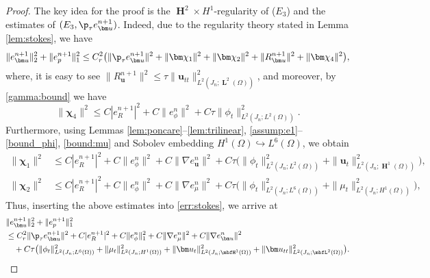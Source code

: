 \begin{proof}
	The key idea for the proof is the $ \mbfH^2\times H^1$-regularity of ($E_3$) and the estimates of $(E_3, \p_\tau e_{\bm u}^{n+1})$. 
	Indeed, due to the  regularity theory stated in Lemma \ref{lem:stokes}, we have
	\begin{equation} \label{err:stokes}
		\|e_{\bm u}^{n+1}\|_2^2+\|e_p^{n+1}\|_1^2\leq  C_r^2 \big(\|\p_\tau e_{\bm u}^{n+1}\|^2+\|\bm \chi_1\|^2 +\|\bm \chi_2\|^2 +\|R_{\bm u}^{n+1}\|^2+ \|\bm \chi_4\|^2 \big),
	\end{equation}
	where, it is easy to see $\|R_{\bm u}^{n+1}\|^2 \le \tau\| \bm u_{tt}\|_{L^2(J_n; \mbfL^2(\Omega))}^2$, and moreover, by \eqref{gamma:bound} we have
	\begin{equation*} 
			\|\bm \chi_4\|^2  \le C|e_R^{n+1}|^2+C\|e_\phi^{n}\|^2+ C\tau\|\phi_t\|_{L^2(J_n; L^2(\Omega))}^2.
	\end{equation*}
	Furthermore, using Lemmas \ref{lem:poncare}--\ref{lem:trilinear}, \eqref{assump:e1}--\eqref{bound_phi}, \eqref{bound:mu} and Sobolev embedding $H^1(\Omega) \hookrightarrow L^6(\Omega)$, we obtain
	\begin{equation*}  
		\begin{aligned}
			\|\bm \chi_1\|^2 
			& \le  C|e_R^{n+1}|^2 + C\|e_{\phi}^n\|^2 +  C \|\nabla e_{\bm u}^{n}\|^2 + C\tau \big(\|\phi_t\|_{L^2(J_n ; L^2(\Omega))}^2+\|\bm u_t\|_{L^2(J_n ; \mbfH^1(\Omega))}^2\big),\\
			\|\bm \chi_2\|^2
			& \le   C|e_R^{n+1}|^2 + C\|e_{\phi}^n\|^2  + C \|\nabla e_\mu^n\|^2  +  C\tau \big( \|\phi_t\|_{L^2(J_n ; L^6(\Omega))}^2+\|\mu_t\|_{L^2(J_n ; H^1(\Omega))}^2\big),
		\end{aligned}
	\end{equation*}
	Thus, inserting the above estimates into \eqref{err:stokes}, we arrive at 
	\begin{equation} \label{err:stokes:2}
		\begin{aligned}
			&  \|e_{\bm u}^{n+1}\|_2^2+\|e_p^{n+1}\|_1^2  \\
			& \leq  C_r^2\|\p_\tau e_{\bm u}^{n+1}\|^2 +  C|e_R^{n+1}|^2+ C\|e_{\phi}^n\|_1^2 +   C\|\nabla e_\mu^n\|^2  + C\|\nabla e_{\bm u}^{n}\|^2 \\
			& \quad    +  C\tau \big(\|\phi_t\|_{L^2(J_n ; L^6(\Omega))}^2+\|\mu_t\|_{L^2(J_n ; H^1(\Omega))}^2+\|\bm u_t\|_{L^2(J_n ; \mbfH^1(\Omega))}^2 +\| \bm u_{tt}\|_{L^2(J_n; \mbfL^2(\Omega))}^2\big).
		\end{aligned}
	\end{equation}
	

\end{proof}
